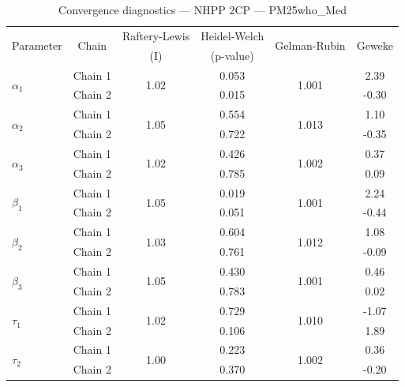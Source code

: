 \begin{table}[H]
\centering
\caption{Convergence diagnostics — NHPP 2CP — PM25who_Med}
\begin{tabular}{lccccc}
\toprule
\multirow{2}{*}{Parameter} & \multirow{2}{*}{Chain} & Raftery-Lewis & Heidel-Welch & \multirow{2}{*}{Gelman-Rubin} & \multirow{2}{*}{Geweke} \\
 & & (I) & (p-value) & & (z) \\
\midrule
\multirow{2}{*}{$\alpha_1$} & Chain 1 & \multirow{2}{*}{1.02} & 0.053 & \multirow{2}{*}{1.001} & 2.39 \\
 & Chain 2 & & 0.015 & & -0.30 \\
\multirow{2}{*}{$\alpha_2$} & Chain 1 & \multirow{2}{*}{1.05} & 0.554 & \multirow{2}{*}{1.013} & 1.10 \\
 & Chain 2 & & 0.722 & & -0.35 \\
\multirow{2}{*}{$\alpha_3$} & Chain 1 & \multirow{2}{*}{1.02} & 0.426 & \multirow{2}{*}{1.002} & 0.37 \\
 & Chain 2 & & 0.785 & & 0.09 \\
\midrule
\multirow{2}{*}{$\beta_1$} & Chain 1 & \multirow{2}{*}{1.05} & 0.019 & \multirow{2}{*}{1.001} & 2.24 \\
 & Chain 2 & & 0.051 & & -0.44 \\
\multirow{2}{*}{$\beta_2$} & Chain 1 & \multirow{2}{*}{1.03} & 0.604 & \multirow{2}{*}{1.012} & 1.08 \\
 & Chain 2 & & 0.761 & & -0.09 \\
\multirow{2}{*}{$\beta_3$} & Chain 1 & \multirow{2}{*}{1.05} & 0.430 & \multirow{2}{*}{1.001} & 0.46 \\
 & Chain 2 & & 0.783 & & 0.02 \\
\midrule
\multirow{2}{*}{$\tau_1$} & Chain 1 & \multirow{2}{*}{1.02} & 0.729 & \multirow{2}{*}{1.010} & -1.07 \\
 & Chain 2 & & 0.106 & & 1.89 \\
\multirow{2}{*}{$\tau_2$} & Chain 1 & \multirow{2}{*}{1.00} & 0.223 & \multirow{2}{*}{1.002} & 0.36 \\
 & Chain 2 & & 0.370 & & -0.20 \\
\bottomrule
\end{tabular}
\end{table}
